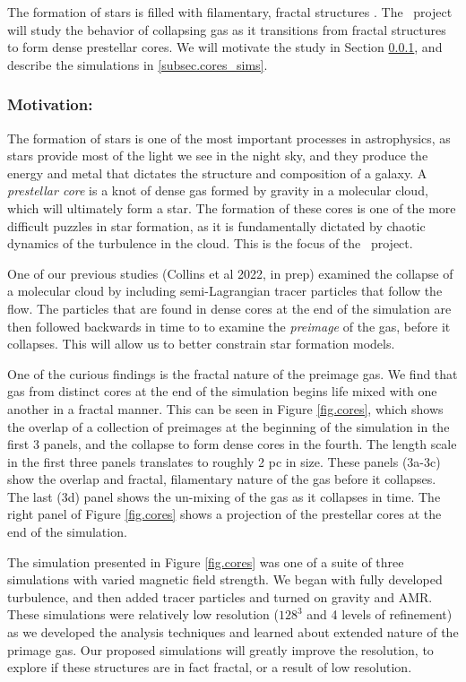 
The formation of stars is filled with filamentary, fractal structures
\citep{Andre14}.  The
\nameCores\ project will study the behavior of collapsing gas as it transitions
from fractal structures to form dense prestellar cores.  We will motivate the
study in Section \ref{subsec.cores_motivate}, and describe the simulations
in \ref{subsec.cores_sims}.


\subsubsection{Motivation: \nameCores}
\label{subsec.cores_motivate}
The formation of stars is one of the most important processes in astrophysics,
as stars provide most of the light we see in the night sky, and they produce the
energy and metal
that dictates the structure and composition of a galaxy.  
A \emph{prestellar core} is a knot of dense gas
formed by gravity in a molecular cloud, which will ultimately form a star.  The
formation of these cores is one of the more difficult puzzles in star formation,
as it is fundamentally dictated by chaotic dynamics of the turbulence in the
cloud.  This is the focus of the \nameCores\ project.

One of our previous studies (Collins et al 2022, in prep) examined the collapse of a molecular cloud by
including semi-Lagrangian tracer particles that follow the flow.  The particles
that are found in dense cores at the end of the simulation are then followed
backwards in time to 
to examine the \emph{preimage} of the gas, before it collapses.  This will allow
us to better constrain star formation models.  

One of the curious findings is the fractal nature of the preimage gas.  We find
that gas from distinct cores at the end of the simulation begins life mixed with
one another in a fractal manner. This can be seen in Figure
\ref{fig.cores}, which shows the overlap of a collection of preimages at the
beginning of the simulation in the first 3 panels, and the
collapse to form dense cores in the fourth.  The length scale in the first three panels translates to
roughly 2 pc in size.  These panels (3a-3c) show the overlap and fractal, filamentary nature of
the gas before it collapses.  The
last (3d) panel shows the un-mixing of the gas as it collapses in time.  The
right panel of Figure \ref{fig.cores} shows a projection of the prestellar cores
at the end of the simulation.

The simulation presented in Figure \ref{fig.cores} was one of a suite of three
simulations with varied magnetic field strength.  We began with fully developed
turbulence, and then added tracer particles and turned on gravity and AMR.  These simulations were
relatively low resolution ($128^3$ and 4 levels of refinement) as we developed the analysis techniques and learned
about extended nature of the primage gas. Our proposed simulations will greatly
improve the resolution,
to explore if these structures are in fact fractal, or a result of low
resolution. 





